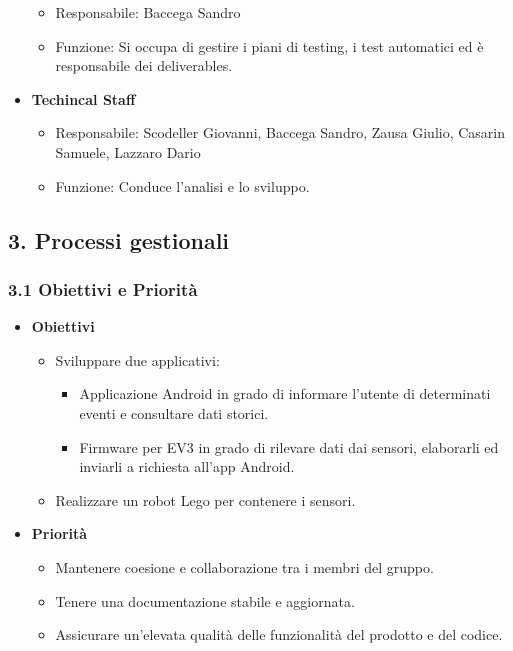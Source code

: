 \documentclass[]{article}
\providecommand{\tightlist}{%
  \setlength{\itemsep}{0pt}\setlength{\parskip}{0pt}}
\begin{document}
\begin{itemize}
  \begin{itemize}
  \tightlist
  \item
    Responsabile: Baccega Sandro
  \item
    Funzione: Si occupa di gestire i piani di testing, i test automatici
    ed è responsabile dei deliverables.
  \end{itemize}
\item
  \textbf{Techincal Staff}

  \begin{itemize}
  \tightlist
  \item
    Responsabile: Scodeller Giovanni, Baccega Sandro, Zausa Giulio,
    Casarin Samuele, Lazzaro Dario
  \item
    Funzione: Conduce l'analisi e lo sviluppo.
  \end{itemize}
\end{itemize}

\hypertarget{processi-gestionali}{%
\subsection{3. Processi gestionali}\label{processi-gestionali}}

\hypertarget{obiettivi-e-priorituxe0}{%
\subsubsection{3.1 Obiettivi e Priorità}\label{obiettivi-e-priorituxe0}}

\begin{itemize}
\tightlist
\item
  \textbf{Obiettivi}

  \begin{itemize}
  \tightlist
  \item
    Sviluppare due applicativi:

    \begin{itemize}
    \tightlist
    \item
      Applicazione Android in grado di informare l'utente di determinati
      eventi e consultare dati storici.
    \item
      Firmware per EV3 in grado di rilevare dati dai sensori, elaborarli
      ed inviarli a richiesta all'app Android.
    \end{itemize}
  \item
    Realizzare un robot Lego per contenere i sensori.
  \end{itemize}
\item
  \textbf{Priorità}

  \begin{itemize}
  \tightlist
  \item
    Mantenere coesione e collaborazione tra i membri del gruppo.
  \item
    Tenere una documentazione stabile e aggiornata.
  \item
    Assicurare un'elevata qualità delle funzionalità del prodotto e del
    codice.
  \end{itemize}
\end{itemize}
\end{document}
